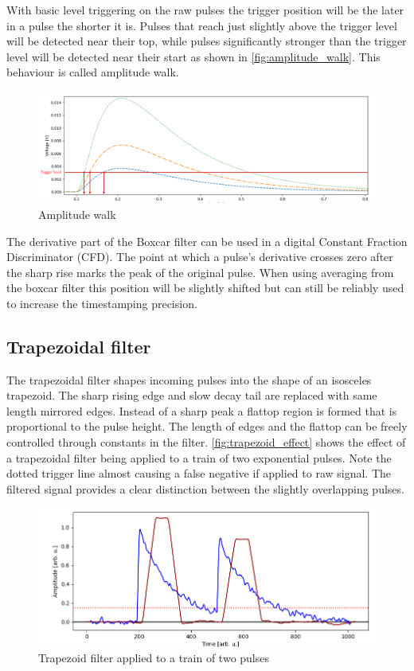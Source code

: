 With basic level triggering
on the raw pulses the trigger position will be the later in a pulse the 
shorter it is. Pulses that reach just slightly above the trigger level
will be detected near their top, while pulses significantly stronger
than the trigger level will be detected near their start as shown in 
\autoref{fig:amplitude_walk}. This behaviour is called amplitude walk.

\begin{figure}[H]
  \centering
  \includegraphics[width=\linewidth]{media/amplitude_walk.png}
  \caption{Amplitude walk}
  \label{fig:amplitude_walk} 
\end{figure}


The derivative part of the Boxcar filter can be used in a
digital Constant Fraction Discriminator (CFD).
The point at which a pulse's derivative crosses zero after 
the sharp rise marks the peak of the original pulse. 
When using averaging from the boxcar filter this position 
will be slightly shifted but can still be reliably used to increase
the timestamping precision.

\subsection{Trapezoidal filter}
The trapezoidal filter shapes incoming pulses into the 
shape of an isosceles trapezoid. The sharp rising edge and 
slow decay tail are replaced with same length mirrored edges.
Instead of a sharp peak a flattop region is formed that is proportional
to the pulse height. The length of edges and the flattop can be freely
controlled through constants in the filter. \autoref{fig:trapezoid_effect}
shows the effect of a trapezoidal filter being applied to a train
of two exponential pulses. Note the dotted trigger line almost 
causing a false negative if applied to raw signal. 
The filtered signal provides a clear distinction 
between the slightly overlapping pulses.

\begin{figure}[H]
  \centering
  \includegraphics[width=\linewidth]{media/trapezoid_effect.png}
  \caption{Trapezoid filter applied to a train of two pulses}
  \label{fig:trapezoid_effect} 
\end{figure}


